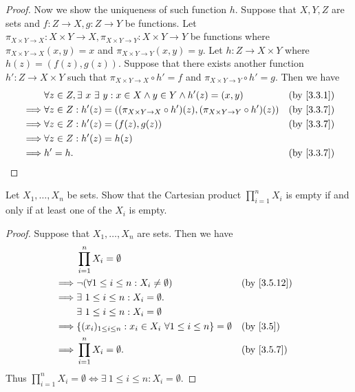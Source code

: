 \begin{proof}
  Now we show the uniqueness of such function \(h\).
  Suppose that \(X, Y, Z\) are sets and \(f : Z \to X, g : Z \to Y\) be functions.
  Let \(\pi_{X \times Y \to X} : X \times Y \to X, \pi_{X \times Y \to Y} : X \times Y \to Y\) be functions where \(\pi_{X \times Y \to X}(x, y) = x\) and \(\pi_{X \times Y \to Y}(x, y) = y\).
  Let \(h : Z \to X \times Y\) where \(h(z) = (f(z), g(z))\).
  Suppose that there exists another function \(h' : Z \to X \times Y\) such that \(\pi_{X \times Y \to X} \circ h' = f\) and \(\pi_{X \times Y \to Y} \circ h' = g\).
  Then we have
  \begin{align*}
             & \forall z \in Z, \exists\ x \ \exists\ y : x \in X \land y \in Y \land h'(z) = (x, y)                  &  & \text{(by \cref{3.3.1})} \\
    \implies & \forall z \in Z : h'(z) = ((\pi_{X \times Y \to X} \circ h')(z), (\pi_{X \times Y \to Y} \circ h')(z)) &  & \text{(by \cref{3.3.7})} \\
    \implies & \forall z \in Z : h'(z) = (f(z), g(z))                                                                 &  & \text{(by \cref{3.3.7})} \\
    \implies & \forall z \in Z : h'(z) = h(z)                                                                                                       \\
    \implies & h' = h.                                                                                                &  & \text{(by \cref{3.3.7})}
  \end{align*}
\end{proof}

\begin{ex}\label{ex:3.5.8}
  Let \(X_1, \dots, X_n\) be sets.
  Show that the Cartesian product \(\prod_{i = 1}^n X_i\) is empty if and only if at least one of the \(X_i\) is empty.
\end{ex}

\begin{proof}
  Suppose that \(X_1, \dots, X_n\) are sets.
  Then we have
  \begin{align*}
             & \prod_{i = 1}^n X_i = \emptyset                                                                                \\
    \implies & \lnot (\forall 1 \leq i \leq n : X_i \neq \emptyset)                            &  & \text{(by \cref{3.5.12})} \\
    \implies & \exists\ 1 \leq i \leq n : X_i = \emptyset.                                                                    \\
             & \exists\ 1 \leq i \leq n : X_i = \emptyset                                                                     \\
    \implies & \{(x_i)_{1 \leq i \leq n} : x_i \in X_i \ \forall 1 \leq i \leq n\} = \emptyset &  & \text{(by \cref{3.5})}    \\
    \implies & \prod_{i = 1}^n X_i = \emptyset.                                                &  & \text{(by \cref{3.5.7})}
  \end{align*}
  Thus \(\prod_{i = 1}^n X_i = \emptyset \iff \exists\ 1 \leq i \leq n : X_i = \emptyset\).
\end{proof}

